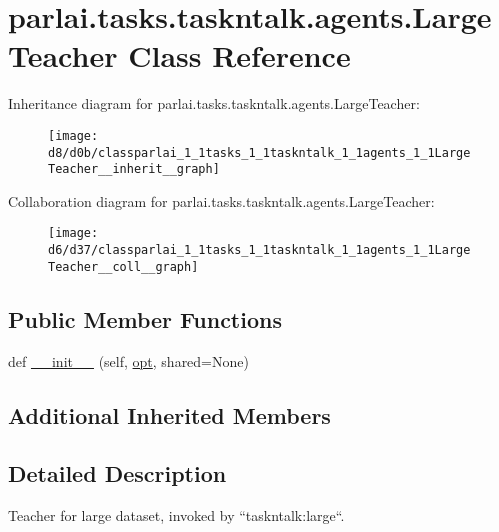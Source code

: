 \hypertarget{classparlai_1_1tasks_1_1taskntalk_1_1agents_1_1LargeTeacher}{}\section{parlai.\+tasks.\+taskntalk.\+agents.\+Large\+Teacher Class Reference}
\label{classparlai_1_1tasks_1_1taskntalk_1_1agents_1_1LargeTeacher}


Inheritance diagram for parlai.\+tasks.\+taskntalk.\+agents.\+Large\+Teacher\+:\nopagebreak
\begin{figure}[H]
\begin{center}
\leavevmode
\texttt{[image: d8/d0b/classparlai\_1\_1tasks\_1\_1taskntalk\_1\_1agents\_1\_1LargeTeacher\_\_inherit\_\_graph]}
\end{center}
\end{figure}


Collaboration diagram for parlai.\+tasks.\+taskntalk.\+agents.\+Large\+Teacher\+:\nopagebreak
\begin{figure}[H]
\begin{center}
\leavevmode
\texttt{[image: d6/d37/classparlai\_1\_1tasks\_1\_1taskntalk\_1\_1agents\_1\_1LargeTeacher\_\_coll\_\_graph]}
\end{center}
\end{figure}
\subsection*{Public Member Functions}
\begin{DoxyCompactItemize}
\item 
def \hyperlink{classparlai_1_1tasks_1_1taskntalk_1_1agents_1_1LargeTeacher_af178f2514d254ac1ae9b0d956041d13c}{\+\_\+\+\_\+init\+\_\+\+\_\+} (self, \hyperlink{classparlai_1_1core_1_1agents_1_1Teacher_a3ce6243860ce978a897922863ed32fa4}{opt}, shared=None)
\end{DoxyCompactItemize}
\subsection*{Additional Inherited Members}


\subsection{Detailed Description}
\begin{DoxyVerb}Teacher for large dataset, invoked by ``taskntalk:large``.
\end{DoxyVerb}
 

